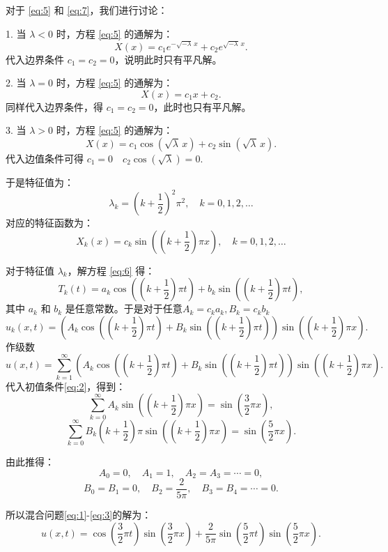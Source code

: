 对于 \eqref{eq:5} 和 \eqref{eq:7}，我们进行讨论：

1. 当 $\lambda < 0$ 时，方程 \eqref{eq:5} 的通解为：
   \[
   X(x) = c_1 e^{-\sqrt{-\lambda} \, x} + c_2 e^{\sqrt{-\lambda} \, x}.
   \]
   代入边界条件 $c_1 = c_2 = 0$，说明此时只有平凡解。

2. 当 $\lambda = 0$ 时，方程 \eqref{eq:5} 的通解为：
   \[
   X(x) = c_1 x + c_2.
   \]
   同样代入边界条件，得 $c_1 = c_2 = 0$，此时也只有平凡解。

3. 当 $\lambda > 0$ 时，方程 \eqref{eq:5} 的通解为：
   \[
   X(x) = c_1 \cos(\sqrt{\lambda} \, x) + c_2 \sin(\sqrt{\lambda} \, x).
   \]
   代入边值条件可得 $c_1 = 0 \quad c_2 \cos(\sqrt{\lambda}) = 0.$

   于是特征值为：
   \[
   \lambda_k = \left(k + \frac{1}{2}\right)^2 \pi^2, \quad k = 0, 1, 2, \dots
   \]
   对应的特征函数为：
   \[
   X_k(x) = c_k \sin\left(\left(k + \frac{1}{2}\right) \pi x\right), \quad k = 0, 1, 2, \dots
   \]

对于特征值 $\lambda_k$，解方程 \eqref{eq:6} 得：
\[
T_k(t) = a_k \cos\left(\left(k + \frac{1}{2}\right) \pi t\right) + b_k \sin\left(\left(k + \frac{1}{2}\right) \pi t\right),
\]
其中 $a_k$ 和 $b_k$ 是任意常数。于是对于任意$A_k=c_ka_k,B_k=c_kb_k$
\[
u_k(x, t) = \left(A_k \cos\left(\left(k + \frac{1}{2}\right) \pi t\right) + B_k \sin\left(\left(k + \frac{1}{2}\right) \pi t\right)\right) \sin\left(\left(k + \frac{1}{2}\right) \pi x\right).
\]
作级数
\[
u(x, t) = \sum_{k=1}^{\infty} \left(A_k \cos\left(\left(k + \frac{1}{2}\right) \pi t\right) + B_k \sin\left(\left(k + \frac{1}{2}\right) \pi t\right)\right) \sin\left(\left(k + \frac{1}{2}\right) \pi x\right).
\]
代入初值条件\eqref{eq:2}，得到：
\[
\sum_{k=0}^{\infty} A_k \sin\left(\left(k + \frac{1}{2}\right) \pi x\right) = \sin\left(\frac{3}{2} \pi x\right),
\]
\[
\sum_{k=0}^{\infty} B_k \left(k + \frac{1}{2}\right) \pi \sin\left(\left(k + \frac{1}{2}\right) \pi x\right) = \sin\left(\frac{5}{2} \pi x\right).
\]

由此推得：
\[
A_0 = 0, \quad A_1 = 1, \quad A_2 = A_3 = \cdots = 0,
\]
\[
B_0 = B_1 = 0, \quad B_2 = \frac{2}{5\pi}, \quad B_3 = B_4 = \cdots = 0.
\]

所以混合问题\eqref{eq:1}-\eqref{eq:3}的解为：
\[
u(x, t) = \cos\left(\frac{3}{2} \pi t\right) \sin\left(\frac{3}{2} \pi x\right) + \frac{2}{5\pi} \sin\left(\frac{5}{2} \pi t\right) \sin\left(\frac{5}{2} \pi x\right).
\]